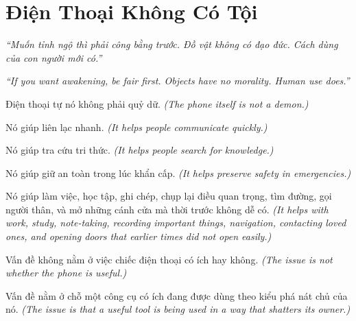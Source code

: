 \chapter{Điện Thoại Không Có Tội}

\begin{center}
	\textit{\color{bookprimary}``Muốn tỉnh ngộ thì phải công bằng trước. Đồ vật không có đạo đức. Cách dùng của con người mới có.''}

	\textit{\color{bookprimary}``If you want awakening, be fair first. Objects have no morality. Human use does.''}
\end{center}

\ngancach

\begin{tcolorbox}[colback=bookprimary!6,colframe=bookprimary!35,arc=5pt,title={\bfseries Góc Suy Nghĩ},fonttitle=\bfseries\color{bookprimary}]
Điện thoại tự nó không phải quỷ dữ.
\textit{(The phone itself is not a demon.)}

Nó giúp liên lạc nhanh.
\textit{(It helps people communicate quickly.)}

Nó giúp tra cứu tri thức.
\textit{(It helps people search for knowledge.)}

Nó giúp giữ an toàn trong lúc khẩn cấp.
\textit{(It helps preserve safety in emergencies.)}

Nó giúp làm việc, học tập, ghi chép, chụp lại điều quan trọng, tìm đường, gọi người thân, và mở những cánh cửa mà thời trước không dễ có.
\textit{(It helps with work, study, note-taking, recording important things, navigation, contacting loved ones, and opening doors that earlier times did not open easily.)}

Vấn đề không nằm ở việc chiếc điện thoại có ích hay không.
\textit{(The issue is not whether the phone is useful.)}

Vấn đề nằm ở chỗ một công cụ có ích đang được dùng theo kiểu phá nát chủ của nó.
\textit{(The issue is that a useful tool is being used in a way that shatters its owner.)}
\end{tcolorbox}

